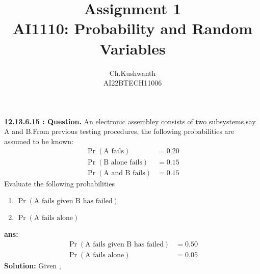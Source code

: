 \documentclass[journal,12pt,twocolumn]{IEEEtran}
\title{\textbf{Assignment 1}
\\ \textbf{AI1110:} Probability and Random Variables}
\author{Ch.Kushwanth
\\ AI22BTECH11006}
\providecommand{\pr}[1]{\ensuremath{\Pr\left(#1\right)}}
\theoremstyle{remark}
\begin{document}
\maketitle
\textbf{12.13.6.15 : Question.}
An electronic assembley consists of two subsystems,say A and B.From previous testing procedures, the following probabilities are assumed to be known:
\begin{align}
\pr{\text{A fails}}&=0.20
\\ \pr{\text{B alone fails}}&=0.15
\\ \pr{\text{A  and B fails}}&=0.15
\end{align}
 Evaluate the following probabilities
 \begin{enumerate}
 \item $\pr{\text{A fails given B has failed}}$
 \item $\pr{\text{A fails alone}}$
\end{enumerate}
 \textbf{ans:}
 \begin{align}
 \pr{\text{A fails given B has failed}}&= 0.50
\\ \pr{\text{A fails alone}}&=0.05
 \end{align}
 \textbf{Solution:}
 Given ,
\end{document}
